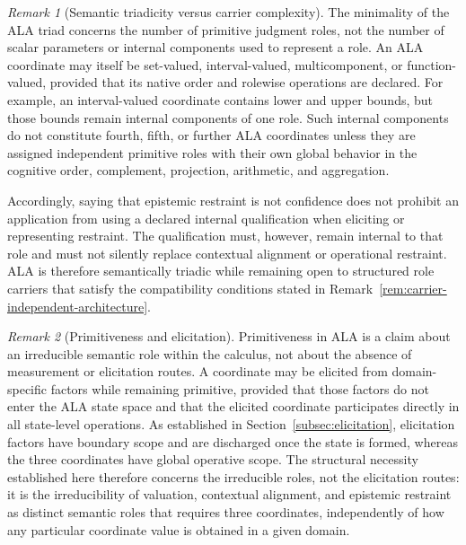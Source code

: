 \documentclass[reqno,final]{amsart}
\theoremstyle{definition}
\theoremstyle{plain}
\theoremstyle{remark}
\newtheorem{remark}{Remark}
\begin{document}
\begin{remark}[Semantic triadicity versus carrier complexity]
\label{rem:triadicity-versus-carrier-complexity}
The minimality of the ALA triad concerns the number of primitive judgment roles, not the number of scalar parameters or internal components used to represent a role. An ALA coordinate may itself be set-valued, interval-valued, multicomponent, or function-valued, provided that its native order and rolewise operations are declared. For example, an interval-valued coordinate contains lower and upper bounds, but those bounds remain internal components of one role. Such internal components do not constitute fourth, fifth, or further ALA coordinates unless they are assigned independent primitive roles with their own global behavior in the cognitive order, complement, projection, arithmetic, and aggregation.

Accordingly, saying that epistemic restraint is not confidence does not prohibit an application from using a declared internal qualification when eliciting or representing restraint. The qualification must, however, remain internal to that role and must not silently replace contextual alignment or operational restraint. ALA is therefore semantically triadic while remaining open to structured role carriers that satisfy the compatibility conditions stated in Remark~\ref{rem:carrier-independent-architecture}.
\end{remark}

\begin{remark}[Primitiveness and elicitation]
\label{rem:primitiveness-elicitation}
Primitiveness in ALA is a claim about an irreducible semantic role within the calculus, not about the absence of measurement or elicitation routes. A coordinate may be elicited from domain-specific factors while remaining primitive, provided that those factors do not enter the ALA state space and that the elicited coordinate participates directly in all state-level operations. As established in Section~\ref{subsec:elicitation}, elicitation factors have boundary scope and are discharged once the state is formed, whereas the three coordinates have global operative scope. The structural necessity established here therefore concerns the irreducible roles, not the elicitation routes: it is the irreducibility of valuation, contextual alignment, and epistemic restraint as distinct semantic roles that requires three coordinates, independently of how any particular coordinate value is obtained in a given domain.
\end{remark}
\end{document}
